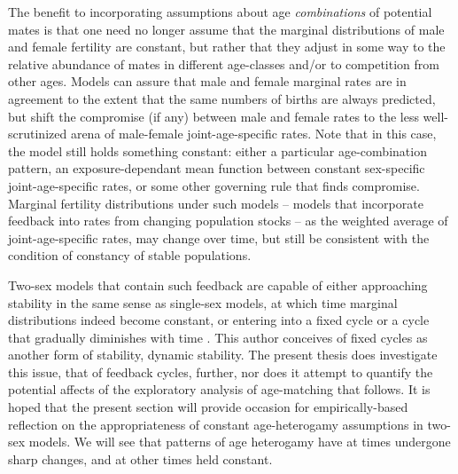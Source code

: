 The benefit to incorporating assumptions about age \textit{combinations} of
potential mates is that one need no longer assume that the marginal
distributions of male and female fertility are constant, but rather that
they adjust in some way to the relative abundance of mates in different
age-classes and/or to competition from other ages. Models can assure
that male and female marginal rates are in agreement to the extent that 
the same numbers of births are always predicted, but shift the
compromise (if any) between male and female rates to the less well-scrutinized
arena of male-female joint-age-specific rates. Note that in this case, the model
still holds something constant: either a particular age-combination pattern, an exposure-dependant
mean function between constant sex-specific joint-age-specific rates, or some
other governing rule that finds compromise. Marginal fertility distributions 
under such models -- models that
incorporate feedback into rates from changing population stocks -- as the
weighted average of joint-age-specific rates, may change over time, but still 
be consistent with the condition of constancy of stable populations.

Two-sex models that contain such feedback are capable of either approaching
stability in the same sense as single-sex models, at which time marginal
distributions indeed become constant, or entering into a fixed
cycle or a cycle that gradually diminishes with time \citep{chung1994cycles}.
This author conceives of fixed cycles as another form of stability, dynamic 
stability. The present thesis does investigate 
this issue, that of feedback cycles, further, nor does it attempt to
quantify the potential affects of the exploratory analysis of age-matching that
follows. It is hoped that the present section will provide
occasion for empirically-based reflection on the appropriateness of
constant age-heterogamy assumptions in two-sex models. We will see that patterns
of age heterogamy have at times undergone sharp changes, and at other times
held constant.

